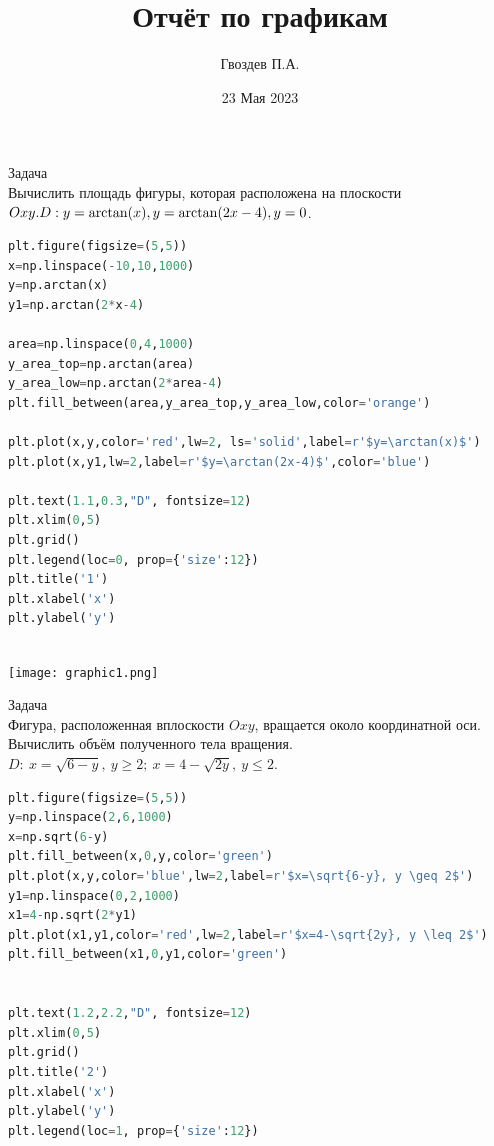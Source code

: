 \documentclass{article}
\author{Гвоздев П.А.}
\title{Отчёт по графикам}
\date{23 Мая 2023}
\begin{document}
\maketitle

\newpage
\begin{section}{Задача}\\

Вычислить площадь фигуры, которая расположена на плоскости $Oxy.\: 
\\D: y=\arctan(x), y=\arctan(2x-4), y=0$.\\

\begin{lstlisting}[language=Python]
plt.figure(figsize=(5,5))
x=np.linspace(-10,10,1000)
y=np.arctan(x)
y1=np.arctan(2*x-4)

area=np.linspace(0,4,1000)
y_area_top=np.arctan(area)
y_area_low=np.arctan(2*area-4)
plt.fill_between(area,y_area_top,y_area_low,color='orange')

plt.plot(x,y,color='red',lw=2, ls='solid',label=r'$y=\arctan(x)$')
plt.plot(x,y1,lw=2,label=r'$y=\arctan(2x-4)$',color='blue')

plt.text(1.1,0.3,"D", fontsize=12)
plt.xlim(0,5)
plt.grid()
plt.legend(loc=0, prop={'size':12})
plt.title('1')
plt.xlabel('x')
plt.ylabel('y')
\end{lstlisting}


\end{section}

\\
   

\texttt{[image: graphic1.png]}






\newpage
\begin{section}{Задача}\\

Фигура, расположенная вплоскости $Oxy$, вращается около координатной оси.
Вычислить объём полученного тела вращения. \\
$D:\: x=\sqrt{6-y},\: y \geq 2;\: x=4-\sqrt{2y},\:y \leq 2$.
\\
\begin{lstlisting}[language=Python]
plt.figure(figsize=(5,5))
y=np.linspace(2,6,1000)
x=np.sqrt(6-y)
plt.fill_between(x,0,y,color='green')
plt.plot(x,y,color='blue',lw=2,label=r'$x=\sqrt{6-y}, y \geq 2$')
y1=np.linspace(0,2,1000)
x1=4-np.sqrt(2*y1)
plt.plot(x1,y1,color='red',lw=2,label=r'$x=4-\sqrt{2y}, y \leq 2$')
plt.fill_between(x1,0,y1,color='green')


plt.text(1.2,2.2,"D", fontsize=12)
plt.xlim(0,5)
plt.grid()
plt.title('2')
plt.xlabel('x')
plt.ylabel('y')
plt.legend(loc=1, prop={'size':12})
\end{lstlisting}


\end{section}
\end{document}
